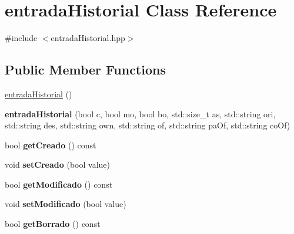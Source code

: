 \hypertarget{classentradaHistorial}{}\section{entrada\+Historial Class Reference}
\label{classentradaHistorial}


{\ttfamily \#include $<$entrada\+Historial.\+hpp$>$}

\subsection*{Public Member Functions}
\begin{DoxyCompactItemize}
\item 
\hyperlink{classentradaHistorial_a899faea9865c1a89fe24306ce634c646}{entrada\+Historial} ()
\item 
\hypertarget{classentradaHistorial_a481ae6103e351fa708864c5488c4049b}{}{\bfseries entrada\+Historial} (bool c, bool mo, bool bo, std\+::size\+\_\+t as, std\+::string ori, std\+::string des, std\+::string own, std\+::string of, std\+::string pa\+Of, std\+::string co\+Of)\label{classentradaHistorial_a481ae6103e351fa708864c5488c4049b}

\item 
\hypertarget{classentradaHistorial_a3126649df21004164e8ffcb94eedb1ac}{}bool {\bfseries get\+Creado} () const \label{classentradaHistorial_a3126649df21004164e8ffcb94eedb1ac}

\item 
\hypertarget{classentradaHistorial_ae8d5cd603ce4e160a71cde6c0337fa01}{}void {\bfseries set\+Creado} (bool value)\label{classentradaHistorial_ae8d5cd603ce4e160a71cde6c0337fa01}

\item 
\hypertarget{classentradaHistorial_aeb1a67858ec0bdb9b7f388c0add876e5}{}bool {\bfseries get\+Modificado} () const \label{classentradaHistorial_aeb1a67858ec0bdb9b7f388c0add876e5}

\item 
\hypertarget{classentradaHistorial_aab34c7712608b9c2050f057d4fdb8a93}{}void {\bfseries set\+Modificado} (bool value)\label{classentradaHistorial_aab34c7712608b9c2050f057d4fdb8a93}

\item 
\hypertarget{classentradaHistorial_a35f68da05c76c6f05804e5c5b93adbac}{}bool {\bfseries get\+Borrado} () const \label{classentradaHistorial_a35f68da05c76c6f05804e5c5b93adbac}


\end{DoxyCompactItemize}
